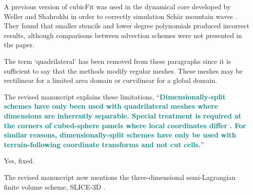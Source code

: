 \documentclass[times]{elsarticle}
\newcommand{\revtwo}[1]{\textcolor{teal}{\textbf{#1}}}
\begin{document}
A previous version of cubicFit was used in the dynamical core developed by Weller and Shahrokhi \citep{weller-shahrokhi2014} in order to correctly simulation Sch\"ar mountain waves \citep{schaer2002}.  They found that smaller stencils and lower degree polynomials produced incorrect results, although comparisons between advection schemes were not presented in the paper.

\begin{quotation}
\begin{comment}
\item The first two paragraphs on p2 refer to quadrilateral meshes. It seems the discussion
has slipped into the 2D vertical slice case without explicitly saying so.
\end{comment}
\end{quotation}
The term `quadrilateral' has been removed from these paragraphs since it is sufficient to say that the methods modify regular meshes.  These meshes may be rectilinear for a limited area domain or curvilinear for a global domain.

\begin{quotation}
\begin{comment}
\item P2, 5th paragraph. Perhaps mention that dimensionally-split schemes are only possible
when the grid permits it (e.g.\ not a hexagonal grid).
\end{comment}
\end{quotation}
The revised manuscript explains these limitations, ``\revtwo{Dimensionally-split schemes have only been used with quadrilateral meshes where dimensions are inherently separable.  Special treatment is required at the corners of cubed-sphere panels where local coordinates differ \citep{putman-lin2007,katta2015}.
For similar reasons, dimensionally-split schemes have only be used with terrain-following coordinate transforms and not cut cells.}''

\begin{quotation}
\begin{comment}
\item P9, last sentence of section 2.1. Should $w_d$ be $m_d$?
\end{comment}
\end{quotation}
Yes, fixed.

\begin{quotation}
\begin{comment}
\item The discussion of previous work is generally very good. On p2 is it worth mentioning
the SLICE scheme of Zerroukat and co-authors? In the first paragraph of section 3.3, credit
for the hexagonal-icosahedral mesh should probably be given to Heikes and Randall.
\end{comment}
\end{quotation}
The revised manuscript now mentions the three-dimensional semi-Lagrangian finite volume scheme, SLICE-3D \citep{zerroukat-allen2012}.
\end{document}
